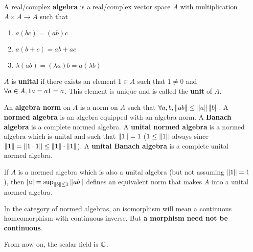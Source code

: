 \documentclass{article}
\begin{document}
A real/complex {\bf algebra} is a real/complex vector space $A$ with multiplication $A \times A \to A$ such that
\begin{enumerate}
  \item $a(bc) = (ab)c$
  \item $a(b + c) = ab + ac$
  \item $\lambda(ab) = (\lambda a)b = a(\lambda b)$
\end{enumerate}

$A$ is {\bf unital} if there exists an element $1 \in A$ such that $1 \ne 0$ and $\forall a \in A, 1a = a1 = a$. This element is unique and is called the {\bf unit} of $A$.

An {\bf algebra norm} on $A$ is a norm on $A$ such that $\forall a, b, \left\lVert ab\right\rVert \le \left\lVert a\right\rVert\left\lVert b\right\rVert$. A {\bf normed algebra} is an algebra equipped with an algebra norm. A {\bf Banach algebra} is a complete normed algebra. A {\bf unital normed algebra} is a normed algebra which is unital and such that $\left\lVert 1\right\rVert = 1$ ($1 \le \left\lVert 1\right\rVert$ always since $\left\lVert 1\right\rVert = \left\lVert 1 \cdot 1\right\rVert \le \left\lVert 1\right\rVert \cdot \left\lVert 1\right\rVert$). A {\bf unital Banach algebra} is a complete unital normed algebra.

If $A$ is a normed algebra which is also a unital algebra (but not assuming $\left\lVert 1\right\rVert = 1$), then $\left\lvert a\right\rvert = \sup_{\left\lVert b\right\rVert \le 1} \left\lVert ab\right\rVert$ defines an equivalent norm that makes $A$ into a unital normed algebra.

In the category of normed algebras, an isomorphism will mean a continuous homeomorphism with continuous inverse. But {\bf a morphism need not be continuous}.

\begin{note}
  From now on, the scalar field is $\mathbb C$.
\end{note}

\newlec
\end{document}
